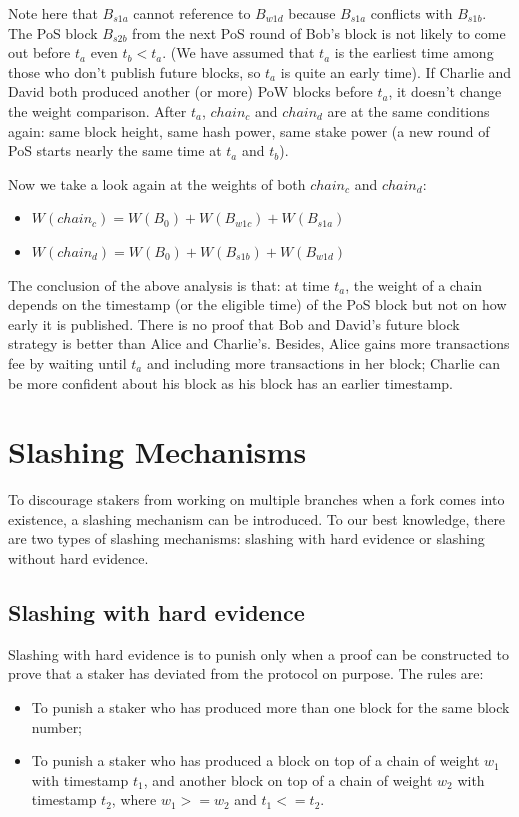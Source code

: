 \documentclass[a4paper]{article}
\begin{document}
\begin{appendices}
Note here that $B_{s1a}$ cannot reference to $B_{w1d}$ because $B_{s1a}$ conflicts with $B_{s1b}$. The PoS block $B_{s2b}$ from the next PoS round of Bob's block is not likely to come out before $t_a$ even $t_b < t_a$. (We have assumed that $t_a$ is the earliest time among those who don't publish future blocks, so $t_a$ is quite an early time). If Charlie and David both produced another (or more) PoW blocks before $t_a$, it doesn't change the weight comparison. After $t_a$, $chain_c$ and $chain_d$ are at the same conditions again: same block height, same hash power, same stake power (a new round of PoS starts nearly the same time at $t_a$ and $t_b$).

Now we take a look again at the weights of both $chain_c$ and $chain_d$:

\begin{itemize}
    \item $W(chain_c) = W(B_0) + W(B_{w1c}) + W(B_{s1a})$
    \item $W(chain_d) = W(B_0) + W(B_{s1b}) + W(B_{w1d})$
\end{itemize}

The conclusion of the above analysis is that: at time $t_a$, the weight of a chain depends on the timestamp (or the eligible time) of the PoS block but not on how early it is published. There is no proof that Bob and David's future block strategy is better than Alice and Charlie's. Besides, Alice gains more transactions fee by waiting until $t_a$ and including more transactions in her block; Charlie can be more confident about his block as his block has an earlier timestamp.

\section{Slashing Mechanisms}
\label{appendix:slashing}


To discourage stakers from working on multiple branches when a fork comes into existence, a slashing mechanism can be introduced. To our best knowledge, there are two types of slashing mechanisms: slashing with hard evidence or slashing without hard evidence.

\subsection{Slashing with hard evidence}

Slashing with hard evidence is to punish only when a proof can be constructed to prove that a staker has deviated from the protocol on purpose. The rules are:
\begin{itemize}
    \item To punish a staker who has produced more than one block for the same block number;
    \item To punish a staker who has produced a block on top of a chain of weight $w_1$ with timestamp $t_1$, and another block on top of a chain of weight $w_2$ with timestamp $t_2$, where $w_1 >= w_2$ and $t_1 <= t_2$.
\end{itemize}


\end{appendices}
\end{document}
